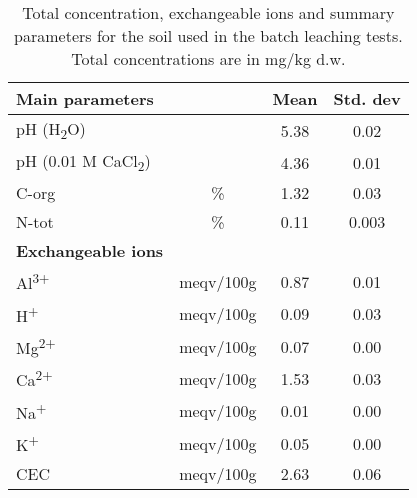 \begin{table}
\centering
\caption{Total concentration, exchangeable ions and summary parameters for the soil used in the batch leaching tests. Total concentrations are in mg/kg d.w.}
\label{apptab:soil}
\begin{tabular}{lccc}
\toprule
\multicolumn{1}{l}{\textbf{Main parameters}}          &                               & \textbf{Mean}                          & \textbf{Std. dev}                      \\ \hline \addlinespace
pH (H\textsubscript{2}O)                      &                               & 5.38                          & 0.02                          \\
pH (0.01 M CaCl\textsubscript{2})             &                               & 4.36                          & 0.01                          \\
C-org                         & \%                            & 1.32                         & 0.03                          \\
N-tot                         & \%                            & 0.11                          & 0.003                         \\ \hline
\textbf{Exchangeable ions}    & \multicolumn{1}{l}{\textbf{}} & \multicolumn{1}{l}{\textbf{}} & \multicolumn{1}{l}{\textbf{}} \\ \hline \addlinespace
Al\textsuperscript{3+}                          & meqv/100g                     & 0.87                          & 0.01                          \\
H\textsuperscript{+}                            & meqv/100g                     & 0.09                          & 0.03                          \\
Mg\textsuperscript{2+}                          & meqv/100g                     & 0.07                          & 0.00                         \\
Ca\textsuperscript{2+}                          & meqv/100g                     & 1.53                          & 0.03                          \\
Na\textsuperscript{+}                           & meqv/100g                     & 0.01                          & 0.00                        \\
K\textsuperscript{+}                            & meqv/100g                     & 0.05                          & 0.00                        \\
CEC                           & meqv/100g                     & 2.63                          & 0.06                          \\ \hline

\end{tabular}
\end{table}
